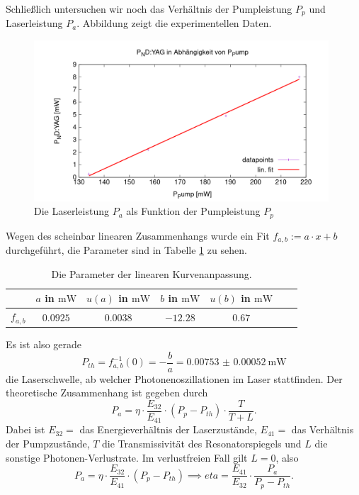 \documentclass[../../../main.tex]{subfiles}
\begin{document}
    Schließlich untersuchen wir noch das Verhältnis der Pumpleistung $P_p$ und Laserleistung $P_a$. Abbildung zeigt die experimentellen Daten.

    \begin{figure}[H]
        \centering
        \includegraphics[width=11cm]{../../Bilddateien/5/P(NDYAG)overP(Pump).png}
        \caption{Die Laserleistung $P_a$ als Funktion der Pumpleistung $P_p$}
        \label{fig:PumpLaserLeistung}
    \end{figure}

    Wegen des scheinbar linearen Zusammenhangs wurde ein Fit $f_{a,b} := a\cdot x + b$ durchgeführt, die Parameter sind in Tabelle \ref{tab:PumpLaserLeistungFitParameter} zu sehen.

    \begin{table}[H]
        \centering
        \begin{tabular}{c|cc|cc|cc}
            \hline
             & $a$ in $\si{\m\W}$ & $u(a)$ in $\si{\m\W}$ & $b$ in $\si{\m\W}$ & $u(b)$ in $\si{\m\W}$ \\
            \hline\hline
            $f_{a, b}$ & $0.0925$ & $0.0038$ & $-12.28$ & $0.67$\\
            \hline
        \end{tabular}
        \caption{Die Parameter der linearen Kurvenanpassung.}
        \label{tab:PumpLaserLeistungFitParameter}
    \end{table}

    Es ist also gerade
    \[
        P_{th} = f^{-1}_{a, b}(0) = -\frac{b}{a} = \SI{0.00753(52)}{\m\W}
    \]
    die Laserschwelle, ab welcher Photonenoszillationen im Laser stattfinden. Der theoretische Zusammenhang ist gegeben durch 
    \[
        P_a = \eta\cdot\frac{E_{32}}{E_{41}}\cdot(P_p - P_{th})\cdot \frac{T}{T + L}.
    \]
    Dabei ist $E_{32} = $ das Energieverhältnis der Laserzustände, $E_{41}=$ das Verhältnis der Pumpzustände, $T$ die Transmissivität des Resonatorspiegels und $L$ die sonstige Photonen-Verlustrate. Im verlustfreien Fall gilt $L=0$, also 
    \[
        P_a = \eta\cdot\frac{E_{32}}{E_{41}}\cdot(P_p - P_{th}) \implies eta = \frac{E_{41}}{E_{32}}\cdot \frac{P_a}{P_p - P_{th}}.
    \] 
\end{document}
